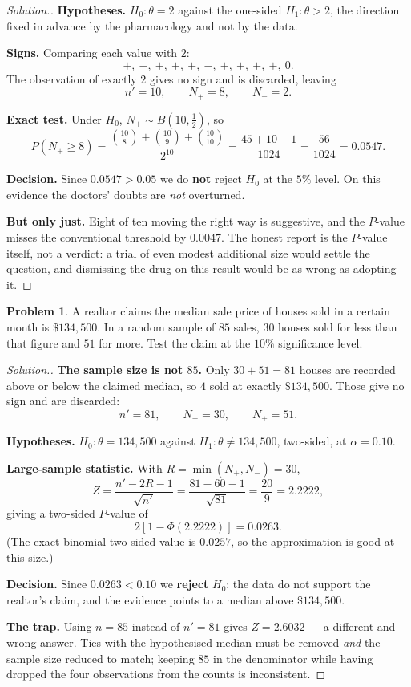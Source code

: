 \documentclass[11pt,a4paper]{article}
\theoremstyle{definition}
\newtheorem{problemx}{Problem}[section]
\newenvironment{problem}{\begin{problemx}}{\end{problemx}}
\newenvironment{solution}
  {\renewcommand{\qedsymbol}{}\begin{proof}[\textit{Solution}.]}
  {\end{proof}}
\begin{document}
\begin{solution}
\textbf{Hypotheses.} $H_0 : \theta = 2$ against the one-sided
$H_1 : \theta > 2$, the direction fixed in advance by the pharmacology and not by
the data.

\textbf{Signs.} Comparing each value with $2$:
$$+,\ -,\ +,\ +,\ +,\ -,\ +,\ +,\ +,\ +,\ 0 .$$
The observation of exactly $2$ gives no sign and is discarded, leaving
$$n' = 10,\qquad N_{+} = 8,\qquad N_{-} = 2 .$$

\textbf{Exact test.} Under $H_0$, $N_{+} \sim B\!\left(10,\tfrac12\right)$, so
$$P\left(N_{+} \geq 8\right)
= \dfrac{\binom{10}{8}+\binom{10}{9}+\binom{10}{10}}{2^{10}}
= \dfrac{45+10+1}{1024} = \dfrac{56}{1024} = 0.0547 .$$

\textbf{Decision.} Since $0.0547 > 0.05$ we do \textbf{not} reject $H_0$ at the
$5\%$ level. On this evidence the doctors' doubts are \emph{not} overturned.

\textbf{But only just.} Eight of ten moving the right way is suggestive, and the
$P$-value misses the conventional threshold by $0.0047$. The honest report is the
$P$-value itself, not a verdict: a trial of even modest additional size would
settle the question, and dismissing the drug on this result would be as wrong as
adopting it.
\end{solution}

\begin{problem}
A realtor claims the median sale price of houses sold in a certain month is
$\$134{,}500$. In a random sample of $85$ sales, $30$ houses sold for less than
that figure and $51$ for more. Test the claim at the $10\%$ significance level.
\end{problem}

\begin{solution}
\textbf{The sample size is not $85$.} Only $30 + 51 = 81$ houses are recorded above
or below the claimed median, so $4$ sold at exactly $\$134{,}500$. Those give no
sign and are discarded:
$$n' = 81,\qquad N_{-} = 30,\qquad N_{+} = 51 .$$

\textbf{Hypotheses.} $H_0 : \theta = 134{,}500$ against
$H_1 : \theta \neq 134{,}500$, two-sided, at $\alpha = 0.10$.

\textbf{Large-sample statistic.} With $R = \min(N_{+},N_{-}) = 30$,
$$Z = \dfrac{n' - 2R - 1}{\sqrt{n'}}
= \dfrac{81 - 60 - 1}{\sqrt{81}} = \dfrac{20}{9} = 2.2222 ,$$
giving a two-sided $P$-value of
$$2\left[1 - \Phi(2.2222)\right] = 0.0263 .$$
(The exact binomial two-sided value is $0.0257$, so the approximation is good at
this size.)

\textbf{Decision.} Since $0.0263 < 0.10$ we \textbf{reject} $H_0$: the data do not
support the realtor's claim, and the evidence points to a median above
$\$134{,}500$.

\textbf{The trap.} Using $n = 85$ instead of $n' = 81$ gives $Z = 2.6032$ --- a
different and wrong answer. Ties with the hypothesised median must be removed
\emph{and} the sample size reduced to match; keeping $85$ in the denominator while
having dropped the four observations from the counts is inconsistent.
\end{solution}
\end{document}
